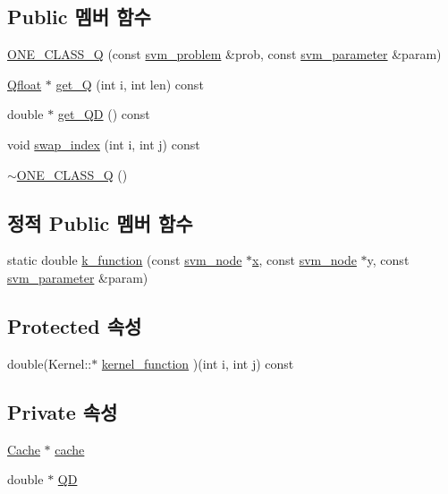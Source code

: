 \subsection*{Public 멤버 함수}
\begin{DoxyCompactItemize}
\item 
\hyperlink{class_o_n_e___c_l_a_s_s___q_a759ec4e3e00887ed848cf3f79ab7065f}{O\+N\+E\+\_\+\+C\+L\+A\+S\+S\+\_\+\+Q} (const \hyperlink{structsvm__problem}{svm\+\_\+problem} \&prob, const \hyperlink{structsvm__parameter}{svm\+\_\+parameter} \&param)
\item 
\hyperlink{svm_8cpp_a8755d90a54ecfb8d15051af3e0542592}{Qfloat} $\ast$ \hyperlink{class_o_n_e___c_l_a_s_s___q_a1f8501234022e017cf46c4dfb2da9d31}{get\+\_\+\+Q} (int i, int len) const 
\item 
double $\ast$ \hyperlink{class_o_n_e___c_l_a_s_s___q_a882480d4370d8a89d667a28c3ed68a73}{get\+\_\+\+Q\+D} () const 
\item 
void \hyperlink{class_o_n_e___c_l_a_s_s___q_ad8bc86ca742c27d82718346388f83fad}{swap\+\_\+index} (int i, int j) const 
\item 
\hyperlink{class_o_n_e___c_l_a_s_s___q_a569ea8969478398736d70eacc84edbad}{$\sim$\+O\+N\+E\+\_\+\+C\+L\+A\+S\+S\+\_\+\+Q} ()
\end{DoxyCompactItemize}
\subsection*{정적 Public 멤버 함수}
\begin{DoxyCompactItemize}
\item 
static double \hyperlink{class_kernel_a6ff0d4ac64bf7fba29d2ca3433dd5127}{k\+\_\+function} (const \hyperlink{structsvm__node}{svm\+\_\+node} $\ast$\hyperlink{class_kernel_a725a35660c4309605c2628fa8290ce5f}{x}, const \hyperlink{structsvm__node}{svm\+\_\+node} $\ast$y, const \hyperlink{structsvm__parameter}{svm\+\_\+parameter} \&param)
\end{DoxyCompactItemize}
\subsection*{Protected 속성}
\begin{DoxyCompactItemize}
\item 
double(Kernel\+::$\ast$ \hyperlink{class_kernel_a575eeb588e8a5c62ff3228a35e255a02}{kernel\+\_\+function} )(int i, int j) const 
\end{DoxyCompactItemize}
\subsection*{Private 속성}
\begin{DoxyCompactItemize}
\item 
\hyperlink{class_cache}{Cache} $\ast$ \hyperlink{class_o_n_e___c_l_a_s_s___q_ac9b44c80098f3dfb45b1119b9db50907}{cache}
\item 
double $\ast$ \hyperlink{class_o_n_e___c_l_a_s_s___q_a12994904e59c98ac7f7ec964ea23b7b4}{Q\+D}
\end{DoxyCompactItemize}


